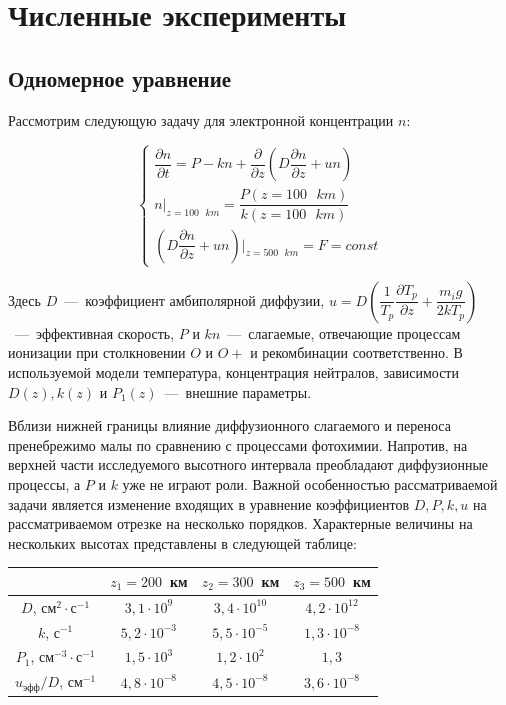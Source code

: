 \documentclass[14pt, a4paper, fleqn, twoside]{extreport}
\begin{document}
\section*{Численные эксперименты}

\subsection*{Одномерное уравнение}

Рассмотрим следующую задачу для электронной концентрации $n$:

$$\begin{cases}
\dfrac{\partial n}{\partial t} = P-kn+\dfrac{\partial}{\partial z}\left(D\dfrac{\partial n}{\partial z} + u n\right)\\
n|_{z=100\mbox{ }km} = \dfrac{P(z=100\mbox{ }km)}{k(z=100\mbox{ }km)}\\
\left(D\dfrac{\partial n}{\partial z} + u n\right)\bigg|_{z=500\mbox{ }km} = F=const
\end{cases}
$$

Здесь $D$~---~коэффициент амбиполярной диффузии, $u = D\left(\dfrac{1}{T_p}\dfrac{\partial T_p}{\partial z}+\dfrac{m_ig}{2kT_p}\right)$~---~эффективная скорость, $P$ и $kn$~---~слагаемые, отвечающие процессам ионизации при столкновении $O$ и $O+$ и рекомбинации соответственно. В используемой модели температура, концентрация нейтралов, зависимости $D(z), k(z)$ и $P_1(z)$~---~внешние параметры.

Вблизи нижней границы влияние диффузионного слагаемого и переноса пренебрежимо малы по сравнению с процессами фотохимии. Напротив, на верхней части исследуемого высотного интервала преобладают диффузионные процессы, а $P$ и $k$ уже не играют роли. Важной особенностью рассматриваемой задачи является изменение входящих в уравнение коэффициентов $D, P, k, u$ на рассматриваемом отрезке на несколько порядков. Характерные величины на нескольких высотах представлены в следующей таблице: 

\smallskip

\begin{tabular}{|c|c|c|c|}
\hline
&$z_1=200$~км&$z_2=300$~км&$z_3=500$~км\\
\hline
$D$, см$^{2}\cdot$с$^{-1}$&$3{,}1\cdot 10^9$&$3{,}4\cdot 10^{10}$&$4{,}2\cdot 10^{12}$\\
\hline
$k$, с$^{-1}$&$5{,}2\cdot 10^{-3}$&$5{,}5\cdot 10^{-5}$&$1{,}3\cdot 10^{-8}$\\
\hline
$P_1$, см$^{-3}\cdot$с$^{-1}$&$1{,}5\cdot 10^3$&$1{,}2\cdot 10^{2}$&$1{,}3$\\
\hline
$u_\textrm{эфф}/D$, см$^{-1}$&$4{,}8\cdot 10^{-8}$&$4{,}5\cdot 10^{-8}$&$3{,}6\cdot 10^{-8}$\\
\hline
\end{tabular}
\end{document}
